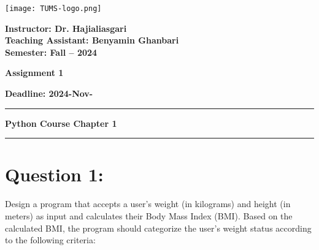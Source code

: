 \documentclass{article}
\begin{document}
\begin{center}
    \texttt{[image: TUMS-logo.png]} %
\end{center}

\vspace{0.5cm}

\begin{center}
    \textbf{Instructor: Dr. Hajialiasgari} \\
    \textbf{Teaching Assistant: Benyamin Ghanbari} \\
    \textbf{Semester: Fall -- 2024} \\ %
\end{center}

\vspace{0.8cm}

\noindent
\begin{minipage}[t]{0.48\textwidth}
    \textbf{Assignment 1} %
\end{minipage}
\begin{minipage}[t]{0.48\textwidth}
    \raggedleft \textbf{Deadline: 2024-Nov-}
\end{minipage}

\vspace{0.5cm}
\hrule %
\vspace{0.5cm}
\begin{center}
    \textbf{\Large Python Course Chapter 1} %
\end{center}
\vspace{0.5cm}
\hrule %

\vspace{0.5cm}

\section*{\small Question 1:}
Design a program that accepts a user's weight (in kilograms) and height (in meters) as input and calculates their Body Mass Index (BMI). Based on the calculated BMI, the program should categorize the user's weight status according to the following criteria:
\end{document}
